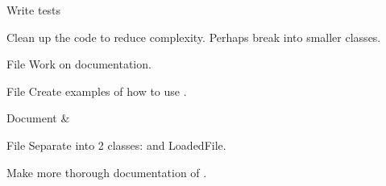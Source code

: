 \begin{DoxyRefList}
Write tests 



Clean up the code to reduce complexity. Perhaps break into smaller classes.  
\item[File \doxylink{_game_camera_8h}{Game\+Camera.h} ]\label{todo__todo000013}%
%
Work on documentation.  
\item[File \doxylink{_input_8h}{Input.h} ]\label{todo__todo000007}%
%
Create examples of how to use . 



Document  \&   
\item[File \doxylink{_registered_file_8h}{Registered\+File.h} ]\label{todo__todo000006}%
%
Separate  into 2 classes\+:  and Loaded\+File. 



Make more thorough documentation of . 
\end{DoxyRefList}